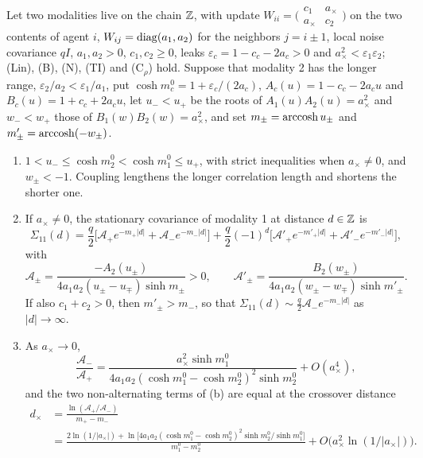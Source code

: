 \begin{proposition}\label{prop:abs-crossover}
Let two modalities live on the chain $\mathbb{Z}$, with update $W_{ii}=\bigl(\begin{smallmatrix}c_1&a_\times\\a_\times&c_2\end{smallmatrix}\bigr)$ on the two contents of agent $i$, $W_{ij}=\operatorname{diag}(a_1,a_2)$ for the neighbors $j=i\pm1$, local noise covariance $qI$, $a_1,a_2>0$, $c_1,c_2\ge0$, leaks $\varepsilon_c=1-c_c-2a_c>0$ and $a_\times^2<\varepsilon_1\varepsilon_2$; (Lin), (B), (N), (TI) and (C$_\rho$) hold. Suppose that modality 2 has the longer range, $\varepsilon_2/a_2<\varepsilon_1/a_1$, put $\cosh m^0_c=1+\varepsilon_c/(2a_c)$, $A_c(u)=1-c_c-2a_cu$ and $B_c(u)=1+c_c+2a_cu$, let $u_-<u_+$ be the roots of $A_1(u)A_2(u)=a_\times^2$ and $w_-<w_+$ those of $B_1(w)B_2(w)=a_\times^2$, and set $m_\pm=\operatorname{arccosh} u_\pm$ and $m'_\pm=\operatorname{arccosh}(-w_\pm)$.
\begin{enumerate}
\item[(a)] $1<u_-\le\cosh m^0_2<\cosh m^0_1\le u_+$, with strict inequalities when $a_\times\ne0$, and $w_\pm<-1$. Coupling lengthens the longer correlation length and shortens the shorter one.
\item[(b)] If $a_\times\ne0$, the stationary covariance of modality 1 at distance $d\in\mathbb{Z}$ is
\[
\Sigma_{11}(d)=\frac q2\bigl[\mathcal A_+e^{-m_+\lvert d\rvert}+\mathcal A_-e^{-m_-\lvert d\rvert}\bigr]+\frac q2(-1)^d\bigl[\mathcal A'_+e^{-m'_+\lvert d\rvert}+\mathcal A'_-e^{-m'_-\lvert d\rvert}\bigr],
\]
with
\[
\mathcal A_\pm=\frac{-A_2(u_\pm)}{4a_1a_2(u_\pm-u_\mp)\sinh m_\pm}>0,\qquad\mathcal A'_\pm=\frac{B_2(w_\pm)}{4a_1a_2(w_\pm-w_\mp)\sinh m'_\pm}.
\]
If also $c_1+c_2>0$, then $m'_\pm>m_-$, so that $\Sigma_{11}(d)\sim\frac q2\mathcal A_-e^{-m_-\lvert d\rvert}$ as $\lvert d\rvert\to\infty$.
\item[(c)] As $a_\times\to0$,
\[
\frac{\mathcal A_-}{\mathcal A_+}=\frac{a_\times^2\sinh m^0_1}{4a_1a_2(\cosh m^0_1-\cosh m^0_2)^2\sinh m^0_2}+O(a_\times^4),
\]
and the two non-alternating terms of (b) are equal at the crossover distance
\begin{align*}
d_\times&=\frac{\ln(\mathcal A_+/\mathcal A_-)}{m_+-m_-}\\
&=\frac{2\ln(1/\lvert a_\times\rvert)+\ln\bigl[4a_1a_2(\cosh m^0_1-\cosh m^0_2)^2\sinh m^0_2/\sinh m^0_1\bigr]}{m^0_1-m^0_2}+O\bigl(a_\times^2\ln(1/\lvert a_\times\rvert)\bigr).
\end{align*}
\end{enumerate}
\end{proposition}

